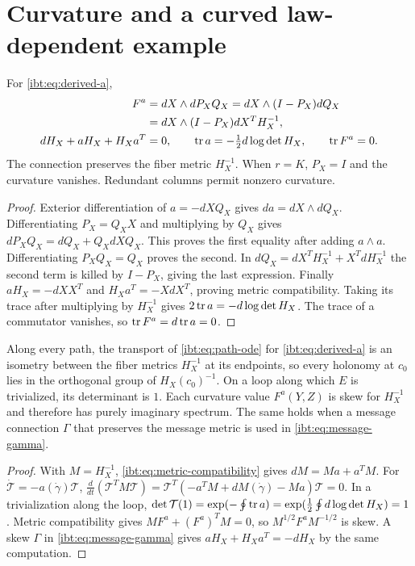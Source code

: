 \section{Curvature and a curved law-dependent example}
\label{ibt:sec:curvature}

For \cref{ibt:eq:derived-a},
\begin{align}
 F^a&=d X\wedge d P_X Q_X
      =d X\wedge(I-P_X)d Q_X\nonumber\\
    &=d X\wedge(I-P_X)d X^T H_X^{-1},
 \label{ibt:eq:curvature}\\
 d H_X+aH_X+H_Xa^T&=0,\qquad
 \operatorname{tr} a=-\tfrac12d\log\det H_X,\qquad \operatorname{tr} F^a=0.
 \label{ibt:eq:metric-compatibility}
\end{align}
The connection preserves the fiber metric $H_X^{-1}$. When $r=K$, $P_X=I$ and the curvature vanishes. Redundant columns permit nonzero curvature.
\begin{proof}
Exterior differentiation of $a=-d XQ_X$ gives $d a=d X\wedge d Q_X$. Differentiating $P_X=Q_XX$ and multiplying by $Q_X$ gives $d P_XQ_X=d Q_X+Q_Xd XQ_X$. This proves the first equality after adding $a\wedge a$. Differentiating $P_XQ_X=Q_X$ proves the second. In $d Q_X=d X^TH_X^{-1}+X^Td H_X^{-1}$ the second term is killed by $I-P_X$, giving the last expression. Finally $aH_X=-d XX^T$ and $H_Xa^T=-Xd X^T$, proving metric compatibility. Taking its trace after multiplying by $H_X^{-1}$ gives $2\operatorname{tr} a=-d\log\det H_X$. The trace of a commutator vanishes, so $\operatorname{tr} F^a=d\operatorname{tr} a=0$.
\end{proof}

Along every path, the transport of \cref{ibt:eq:path-ode} for \cref{ibt:eq:derived-a} is an isometry between the fiber metrics $H_X^{-1}$ at its endpoints, so every holonomy at $c_0$ lies in the orthogonal group of $H_X(c_0)^{-1}$. On a loop along which $E$ is trivialized, its determinant is $1$. Each curvature value $F^a(Y,Z)$ is skew for $H_X^{-1}$ and therefore has purely imaginary spectrum. The same holds when a message connection $\Gamma$ that preserves the message metric is used in \cref{ibt:eq:message-gamma}.
\begin{proof}
With $M=H_X^{-1}$, \cref{ibt:eq:metric-compatibility} gives $dM=Ma+a^TM$. For $\dot{\mathcal T}=-a(\dot\gamma)\mathcal T$, $\frac{d}{dt}(\mathcal T^TM\mathcal T)=\mathcal T^T(-a^TM+dM(\dot\gamma)-Ma)\mathcal T=0$. In a trivialization along the loop, $\det\mathcal T(1)=\exp(-\oint\operatorname{tr} a)=\exp(\tfrac12\oint d\log\det H_X)=1$. Metric compatibility gives $MF^a+(F^a)^TM=0$, so $M^{1/2}F^aM^{-1/2}$ is skew. A skew $\Gamma$ in \cref{ibt:eq:message-gamma} gives $aH_X+H_Xa^T=-dH_X$ by the same computation.
\end{proof}

